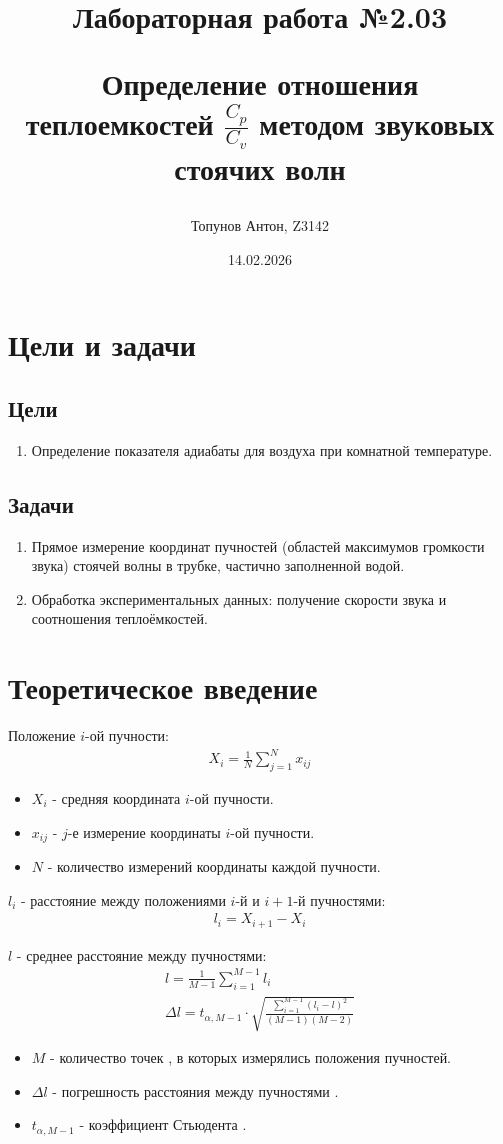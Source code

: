 \documentclass{article}
\title{Лабораторная работа №2.03

Определение отношения теплоемкостей $ \frac{ C_{ p}}{ C_{ v}} $ методом звуковых стоячих волн}
\author{Топунов Антон, Z3142}
\date{14.02.2026}
\begin{document}
\maketitle
\clearpage
\section{Цели и задачи}
\subsection{Цели}
\begin{enumerate}
    \item Определение показателя адиабаты для воздуха при комнатной температуре.
\end{enumerate}
\subsection{Задачи}
\begin{enumerate}
    \item Прямое измерение координат пучностей (областей максимумов громкости звука) стоячей волны в трубке, частично заполненной водой.
    \item Обработка экспериментальных данных: получение скорости звука и соотношения теплоёмкостей.
\end{enumerate}
\section{Теоретическое введение}

Положение $i$-ой пучности:
\begin{gather*}
    X_{ i} = \frac{ 1}{ N}\sum\limits_{ j=1}^{ N}x_{ ij} 
\end{gather*}
\begin{itemize}
    \item $X_{ i}$ - средняя координата $i$-ой пучности.
    \item $x_{ ij}$ - $j$-е измерение координаты $i$-ой пучности.
    \item $N$ - количество измерений координаты каждой пучности. 
\end{itemize}

$l_{ i}$ - расстояние между положениями $i$-й и $i+1$-й пучностями:
\begin{gather*}
    l_{ i}=X_{ i+1} - X_{ i}
\end{gather*}

$l$ - среднее расстояние между пучностями:
\begin{gather*}
    l = \frac{ 1}{ M-1} \sum\limits_{ i=1}^{ M-1}l_{ i} \\
    \Delta l = t_{ \alpha ,  M-1}\cdot 
        \sqrt{\frac{ \sum\limits_{ i=1}^{M-1 }(l_{ i}-l)^2}{ (M-1)(M-2)} }
\end{gather*}
\begin{itemize}
    \item $M$ - количество точек , в которых измерялись положения пучностей.
    \item $\Delta l$ - погрешность расстояния между пучностями .
    \item $t_{ \alpha ,  M-1}$ - коэффициент Стьюдента .
\end{itemize}
\end{document}
